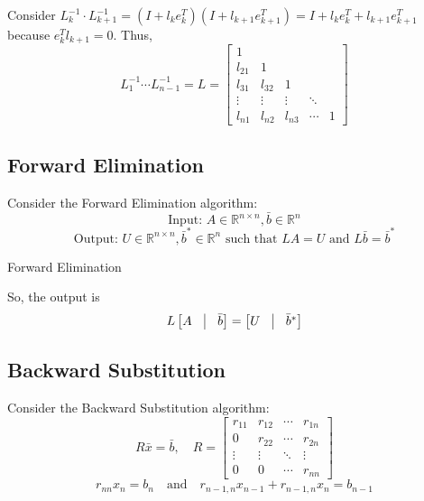 \documentclass[11pt]{article}
\begin{document}
Consider \(L_k^{-1} \cdot L_{k+1}^{-1} = (I + l_k e_k^T)(I + l_{k+1} e_{k+1}^T) = I + l_k e_k^T + l_{k+1} e_{k+1}^T\) because \(e_k^T l_{k+1} = 0\). Thus,
\[L_1^{-1} \cdots L_{n-1}^{-1} = L = \begin{bmatrix}
    1 & & & & \\
    l_{21} & 1 & & & \\
    l_{31} & l_{32} & 1 & & \\
    \vdots & \vdots & \vdots & \ddots & \\
    l_{n1} & l_{n2} & l_{n3} & \cdots & 1
\end{bmatrix} \]

\subsection{Forward Elimination}
Consider the Forward Elimination algorithm:
\[\text{Input: } A \in \mathbb{R}^{n \times n}, \bar{b} \in \mathbb{R}^n\]
\[\text{Output: } U \in \mathbb{R}^{n \times n}, \bar{b}^* \in \mathbb{R}^n \text{ such that } L A = U \text{ and } L \bar{b} = \bar{b}^*\]

\begin{algorithm}[H]
\caption{Forward Elimination}
\end{algorithm}
\vskip 0.5cm
So, the output is
\[L \begin{bmatrix}
    A & \vline & \bar{b} 
\end{bmatrix} = \begin{bmatrix}
    U & \vline & \bar{b}^*
\end{bmatrix}
\]

\subsection{Backward Substitution}
Consider the Backward Substitution algorithm:
\[R \bar{x} = \bar{b}, \quad R = \begin{bmatrix}
    r_{11} & r_{12} & \cdots & r_{1n} \\
    0 & r_{22} & \cdots & r_{2n} \\
    \vdots & \vdots & \ddots & \vdots \\
    0 & 0 & \cdots & r_{nn}
\end{bmatrix}\]
\[r_{nn} x_n = b_n \quad \text{and} \quad r_{n-1, n} x_{n-1} + r_{n-1, n} x_n = b_{n-1}\]
\end{document}
